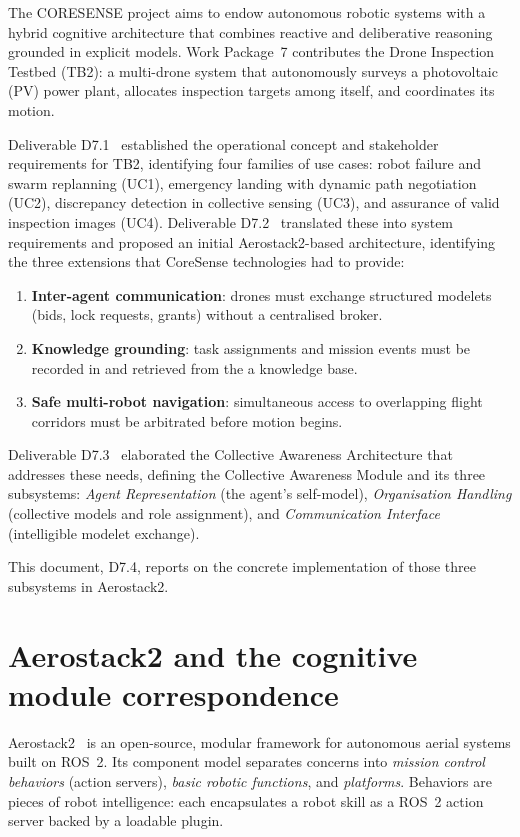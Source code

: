 \documentclass[deliverable]{csreport}
\begin{document}
The CORESENSE project aims to endow autonomous robotic systems with a hybrid cognitive architecture that combines reactive and deliberative reasoning grounded in explicit models. Work Package~7 contributes the Drone Inspection Testbed (TB2): a multi-drone system that autonomously surveys a photovoltaic (PV) power plant, allocates inspection targets among itself, and coordinates its motion.

Deliverable D7.1~\cite{CORESENSE-D71} established the operational concept and stakeholder requirements for TB2, identifying four families of use cases: robot failure and swarm replanning (UC1), emergency landing with dynamic path negotiation (UC2), discrepancy detection in collective sensing (UC3), and assurance of valid inspection images (UC4). Deliverable D7.2~\cite{CORESENSE-D72} translated these into system requirements and proposed an initial Aerostack2-based architecture, identifying the three extensions that CoreSense technologies had to provide:
\begin{enumerate}
  \item \textbf{Inter-agent communication}: drones must exchange structured modelets (bids, lock requests, grants) without a centralised broker.
  \item \textbf{Knowledge grounding}: task assignments and mission events must be recorded in and retrieved from the a knowledge base.
  \item \textbf{Safe multi-robot navigation}: simultaneous access to overlapping flight corridors must be arbitrated before motion begins.
\end{enumerate}

Deliverable D7.3~\cite{CORESENSE-D73} elaborated the Collective Awareness Architecture that addresses these needs, defining the Collective Awareness Module and its three subsystems: \emph{Agent Representation} (the agent's self-model), \emph{Organisation Handling} (collective models and role assignment), and \emph{Communication Interface} (intelligible modelet exchange).

This document, D7.4, reports on the concrete implementation of those three subsystems in Aerostack2.

\section{Aerostack2 and the cognitive module correspondence}

Aerostack2~\cite{AS2-2023} is an open-source, modular framework for autonomous aerial systems built on ROS~2. Its component model separates concerns into \emph{mission control} \emph{behaviors} (action servers), \emph{basic robotic functions}, and \emph{platforms}. Behaviors are pieces of robot intelligence: each encapsulates a robot skill as a ROS~2 action server backed by a loadable plugin.
\end{document}
